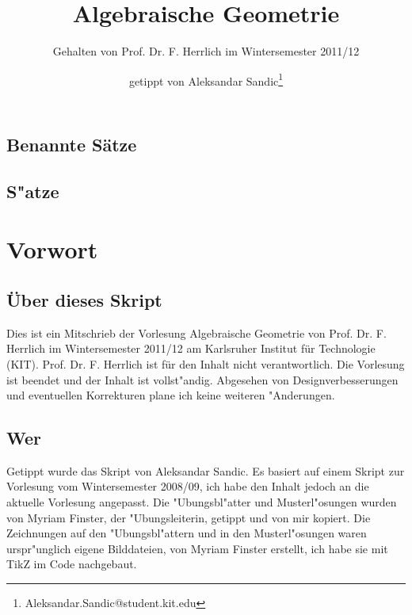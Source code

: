 \documentclass[a4paper, 12pt, numbers=noendperiod, chapterprefix=true]{scrbook}
\title{Algebraische Geometrie}
\subtitle{Gehalten von Prof. Dr. F. Herrlich im Wintersemester 2011/12}
\author{getippt von Aleksandar Sandic\thanks{Aleksandar.Sandic@student.kit.edu}}
\theoremstyle{break}
\theoremstyle{nonumberbreak}
\theoremstyle{nonumberplain}
\newcommand{\quot}[1]{\textrm{\glqq}{#1}\textrm{\grqq}}
\begin{document}
\maketitle

\setlength\parskip{0.6pt}
\tableofcontents

\section*{Benannte S\"atze}


\section*{S"atze}


\setlength\parskip{\smallskipamount}



\chapter{Vorwort}
\setcounter{secnumdepth}{2}
\section*{\"Uber dieses Skript}
Dies ist ein Mitschrieb der Vorlesung \quot{Algebraische Geometrie} von Prof. Dr. F. Herrlich im Wintersemester 2011/12 am Karlsruher Institut f\"ur Technologie (KIT). Prof. Dr. F. Herrlich ist f\"ur  den Inhalt nicht verantwortlich. Die Vorlesung ist beendet und der Inhalt ist vollst"andig. Abgesehen von Designverbesserungen und eventuellen Korrekturen plane ich keine weiteren "Anderungen.

\section*{Wer}
Getippt wurde das Skript von Aleksandar Sandic. Es basiert auf einem Skript zur Vorlesung vom Wintersemester 2008/09, ich habe den Inhalt jedoch an die aktuelle Vorlesung angepasst. Die "Ubungsbl"atter und Musterl"osungen wurden von Myriam Finster, der "Ubungsleiterin, getippt und von mir kopiert. Die Zeichnungen auf den "Ubungsbl"attern und in den Musterl"osungen waren urspr"unglich eigene Bilddateien, von Myriam Finster erstellt, ich habe sie mit TikZ im Code nachgebaut.
\end{document}
